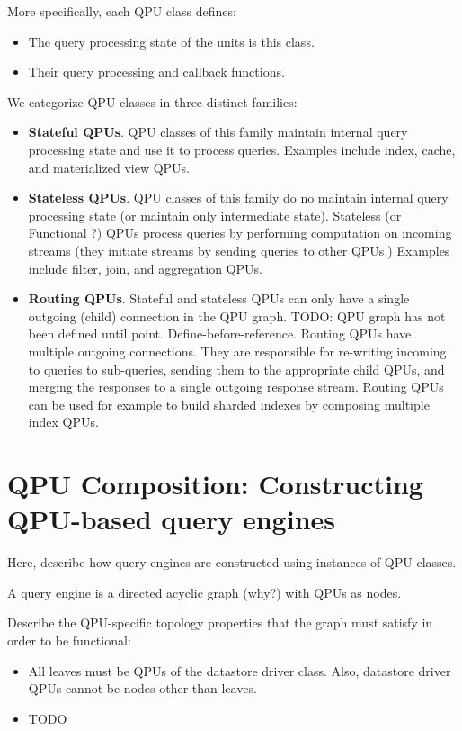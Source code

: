 More specifically, each QPU class defines:
\begin{itemize}
  \item The query processing state of the units is this class.
  \item Their query processing and callback functions.
\end{itemize}

We categorize QPU classes in three distinct families:
\begin{itemize}
  \item \textbf{Stateful QPUs}. QPU classes of this family maintain internal
  query processing state and use it to process queries.
  Examples include index, cache, and materialized view QPUs.
  \item \textbf{Stateless QPUs}. QPU classes of this family do no maintain
  internal query processing state (or maintain only intermediate state).
  Stateless (or Functional ?) QPUs process queries by performing computation on
  incoming streams (they initiate streams by sending queries to other QPUs.)
  Examples include filter, join, and aggregation QPUs.
  \item \textbf{Routing QPUs}. Stateful and stateless QPUs can only have a
  single outgoing (child) connection in the QPU graph.
  TODO: QPU graph has not been defined until point. Define-before-reference.
  Routing QPUs have multiple outgoing connections.
  They are responsible for re-writing incoming to queries to sub-queries,
  sending them to the appropriate child QPUs, and merging the responses to a
  single outgoing response stream.
  Routing QPUs can be used for example to build sharded indexes by composing
  multiple index QPUs.
\end{itemize}

\section{QPU Composition: Constructing QPU-based query engines}
Here, describe how query engines are constructed using instances of QPU classes.

A query engine is a directed acyclic graph (why?) with QPUs as nodes.

Describe the QPU-specific topology properties that the graph must satisfy in
order to be functional:
\begin{itemize}
  \item All leaves must be QPUs of the datastore driver class.
  Also, datastore driver QPUs cannot be nodes other than leaves.
  \item TODO
\end{itemize}

